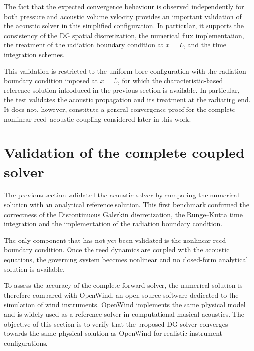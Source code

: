 \documentclass[11pt,a4paper]{report}
\theoremstyle{plain}
\theoremstyle{definition}
\begin{document}
The fact that the expected convergence behaviour is observed independently for
both pressure and acoustic volume velocity provides an important validation of
the acoustic solver in this simplified configuration. In particular, it
supports the consistency of the DG spatial discretization, the numerical flux
implementation, the treatment of the radiation boundary condition at \(x=L\),
and the time integration schemes.

This validation is restricted to the uniform-bore configuration with the
radiation boundary condition imposed at \(x=L\), for which the
characteristic-based reference solution introduced in the previous section is
available. In particular, the test validates the acoustic propagation and its
treatment at the radiating end. It does not, however, constitute a general
convergence proof for the complete nonlinear reed--acoustic coupling considered
later in this work.


\section{Validation of the complete coupled solver}

The previous section validated the acoustic solver by comparing the numerical
solution with an analytical reference solution. This first benchmark confirmed
the correctness of the Discontinuous Galerkin discretization, the Runge--Kutta
time integration and the implementation of the radiation boundary condition.

The only component that has not yet been validated is the nonlinear reed
boundary condition. Once the reed dynamics are coupled with the acoustic
equations, the governing system becomes nonlinear and no closed-form analytical
solution is available.

To assess the accuracy of the complete forward solver, the numerical solution
is therefore compared with OpenWind, an open-source software dedicated to the
simulation of wind instruments. OpenWind \cite{OpenwindInria} implements the same physical model and
is widely used as a reference solver in computational musical acoustics. The
objective of this section is to verify that the proposed DG solver converges
towards the same physical solution as OpenWind for realistic instrument
configurations.

\end{document}
